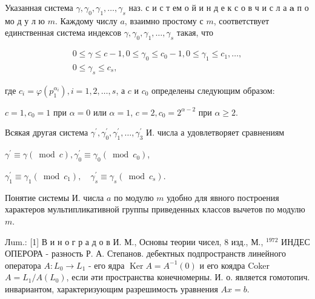 \documentclass[10pt]{article}
\begin{document}
Указанная система $\gamma, \gamma_{0}, \gamma_{1}, \ldots, \gamma_{s}$ наз. с и с т ем о й и н д е к с о в ч и с л а $\boldsymbol{a}$ п о мо д у л ю $m$. Каждому числу $a$, взаимно простому с $m$, соответствует единственная система индексов $\gamma, \gamma_{0}, \gamma_{1}, \ldots, \gamma_{s}$ такая, что



\[

\begin{aligned}

0 \leqslant \gamma \leqslant c-1,0 \leqslant \gamma_{0} \leqslant c_{0}-1,0 \leqslant \gamma_{1} \leqslant c_{1}, \ldots, \\

0 \leqslant \gamma_{s} \leqslant c_{s},

\end{aligned}

\]



где $c_{i}=\varphi\left(p_{1}^{\alpha_{i}}\right), i=1,2, \ldots, s$, а $c$ и $c_{0}$ определены следующим образом:



$c=1, c_{0}=1$ при $\alpha=0$ или $\alpha=1$, $c=2, c_{0}=2^{\alpha-2}$ при $\alpha \geqslant 2$.



Всякая другая система $\gamma^{\prime}, \gamma_{0}^{\prime}, \gamma_{1}^{\prime}, \ldots, \gamma_{3}^{\prime}$ И. числа $а$ удовлетворяет сравнениям



$\gamma^{\prime} \equiv \gamma(\bmod c), \gamma_{0}^{\prime} \equiv \gamma_{0}\left(\bmod c_{0}\right)$,



$\gamma_{1}^{\prime} \equiv \gamma_{1}\left(\bmod c_{1}\right), \quad \gamma_{s}^{\prime} \equiv \gamma_{s}\left(\bmod c_{s}\right)$.



Понятие системы И. числа $a$ по модулю $m$ удобно для явного построения характеров мультипликативной группы приведенных классов вычетов по модулю $m$.



Лum.: [1] В и н о г р а д о в И. М., Основы теории чисел, 8 изд., М., ${ }^{1972}$ ИНДЕС ОПЕРОРА - разность Р. А. Степанов. дебектных подпространств линейного оператора $A: L_{0} \rightarrow L_{1}$ - его ядра $\operatorname{Ker} A=A^{-1}(0)$ и его коядра Coker $A=L_{1} / A\left(L_{0}\right)$, если әти пространства конечномерны. И. о. является гомотопич. инвариантом, характеризующим разрешимость уравнения $A x=b$.
\end{document}
